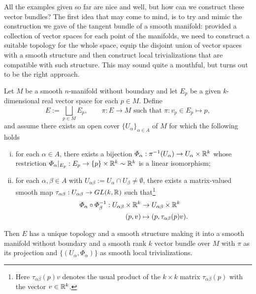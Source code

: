 All the examples given so far are nice and well, but how can we construct these vector bundles?
The first idea that may come to mind, is to  try and mimic the construction we gave of the tangent bundle of a smooth manifold: provided a collection of vector spaces for each point of the manifolds, we need to construct a suitable topology for the whole space, equip the disjoint union of vector spaces with a smooth structure and then construct local trivializations that are compatible with such structure.
This may sound quite a mouthful, but turns out to be the right approach.

\begin{theorem}\label{thm:bundle_chart_thm}
	Let $M$ be a smooth $n$-manifold without boundary and let $E_p$ be a given $k$-dimensional real vector space for each $p\in M$.
	Define
	\begin{equation}
		E := \bigsqcup_{p\in M} E_p, \qquad
		\pi : E\to M \mbox{ such that } \pi : v_p \in E_p \mapsto p,
	\end{equation}
	and assume there exists an open cover $\{U_\alpha\}_{\alpha\in A}$ of $M$ for which the following holds
	\begin{enumerate}[(i)]
		\item for each $\alpha\in A$, there exists a bijection $\varPhi_\alpha: \pi^{-1}(U_\alpha) \to U_\alpha\times\mathbb{R}^k$ whose restriction $\varPhi_\alpha|_{E_p} : E_p \to \{p\}\times\mathbb{R}^k \sim \mathbb{R}^k$ is a linear isomorphism;
		\item for each $\alpha,\beta \in A$ with $U_{\alpha\beta}:=U_\alpha \cap U_\beta \neq \emptyset$, there exists a matrix-valued smooth map $\tau_{\alpha\beta}: U_{\alpha\beta} \to GL(k,\mathbb{R})$ such that\footnote{Here $\tau_{\alpha\beta}(p) v$ denotes the usual product of the $k\times k$ matrix $\tau_{\alpha\beta}(p)$ with the vector $v\in\mathbb{R}^k$.}
		      \begin{align}
			      \varPhi_\alpha \circ \varPhi_\beta^{-1} : U_{\alpha\beta}\times\mathbb{R}^k & \to U_{\alpha\beta}\times\mathbb{R}^k         \\
			      (p, v)                                                              & \mapsto (p, \tau_{\alpha\beta}(p) v).
		      \end{align}
	\end{enumerate}
	Then $E$ has a unique topology and a smooth structure making it into a smooth manifold without boundary and a smooth rank $k$ vector bundle over $M$ with $\pi$ as its projection and $\{(U_\alpha, \varPhi_\alpha)\}$ as smooth local trivializations.
\end{theorem}
